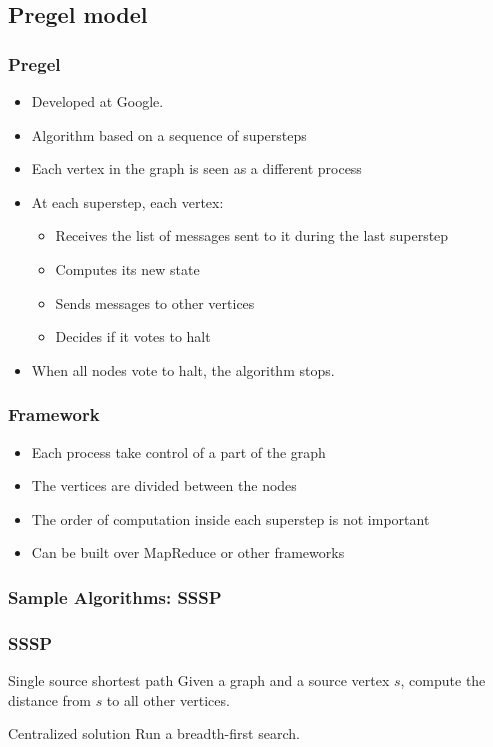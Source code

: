 \subsection{Pregel model}
\begin{frame}
 \frametitle{Pregel}

\begin{itemize}
 \item Developed at Google.
 \item Algorithm based on a sequence of supersteps
 \item Each vertex in the graph is seen as a different process
 \item At each superstep, each vertex:
 \begin{itemize}
   \item Receives the list of messages sent to it during the last superstep
   \item Computes its new state
   \item Sends messages to other vertices
   \item Decides if it votes to halt
 \end{itemize}
 \item When all nodes vote to halt, the algorithm stops.
\end{itemize}
\end{frame}
% 

\begin{frame}
 \frametitle{Framework}  
 \begin{itemize}
  \item Each process take control of a part of the graph 
  \item The vertices are divided between the nodes
  \item The order of computation inside each superstep is not important
  \item Can be built over MapReduce or other frameworks
 \end{itemize}
\end{frame}

\subsubsection{Sample Algorithms: SSSP}
\begin{frame}
 \frametitle{SSSP}
\begin{block}{Single source shortest path}
 Given a graph and a source vertex $s$, compute the distance from $s$ to all other vertices.
\end{block}

\begin{block}{Centralized solution}
 Run a breadth-first search.
\end{block}
\end{frame}

